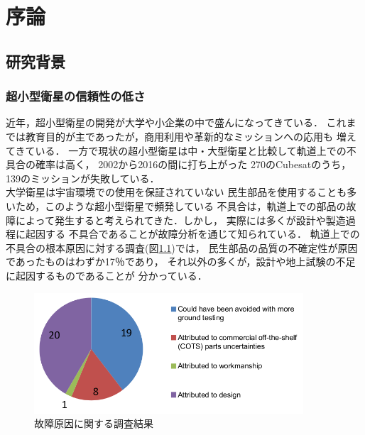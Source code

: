\documentclass[11pt]{jsreport}
\begin{document}
\fi

\chapter{序論}
\section{研究背景} 
\subsection{超小型衛星の信頼性の低さ}
近年，超小型衛星の開発が大学や小企業の中で盛んになってきている．
これまでは教育目的が主であったが，商用利用や革新的なミッションへの応用も
増えてきている\cite{Langer2016}．
一方で現状の超小型衛星は中・大型衛星と比較して軌道上での不具合の確率は高く，
2002から2016の間に打ち上がった
270のCubesatのうち，139のミッションが失敗している\cite{Langer2016}．\\
大学衛星は宇宙環境での使用を保証されていない
民生部品を使用することも多いため，このような超小型衛星で頻発している
不具合は，軌道上での部品の故障によって発生すると考えられてきた．しかし，
実際には多くが設計や製造過程に起因する
不具合であることが故障分析を通じて知られている\cite{Venturini2017}．
軌道上での不具合の根本原因に対する調査(図\ref{fig:cause of failure})では，
民生部品の品質の不確定性が原因であったものはわずか17％であり，
それ以外の多くが，設計や地上試験の不足に起因するものであることが
分かっている\cite{Venturini2017}．

\begin{figure}[H]
   \centering
      \includegraphics[height=4.5cm]{figure/cause_of_failure.png}
      \caption{故障原因に関する調査結果\cite{Venturini2017}}
      \label{fig:cause of failure}
\end{figure}
\end{document}
